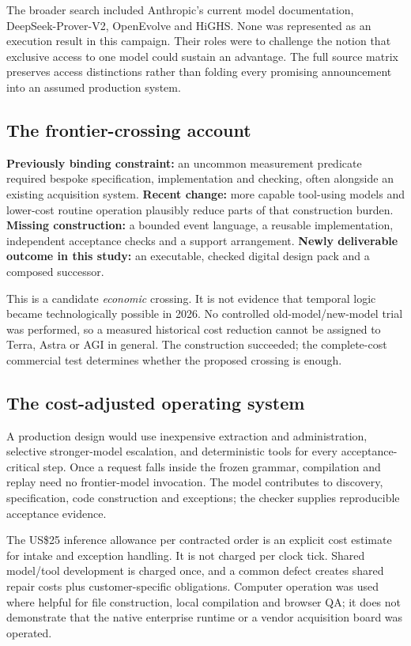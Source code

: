 The broader search included Anthropic's current model documentation, DeepSeek-Prover-V2, OpenEvolve and HiGHS. None was represented as an execution result in this campaign. Their roles were to challenge the notion that exclusive access to one model could sustain an advantage. The full source matrix preserves access distinctions rather than folding every promising announcement into an assumed production system.\cite{alphaevolve,openevolve,deepseek,yosys}

\subsection{The frontier-crossing account}
\textbf{Previously binding constraint:} an uncommon measurement predicate required bespoke specification, implementation and checking, often alongside an existing acquisition system. \textbf{Recent change:} more capable tool-using models and lower-cost routine operation plausibly reduce parts of that construction burden. \textbf{Missing construction:} a bounded event language, a reusable implementation, independent acceptance checks and a support arrangement. \textbf{Newly deliverable outcome in this study:} an executable, checked digital design pack and a composed successor.

This is a candidate \emph{economic} crossing. It is not evidence that temporal logic became technologically possible in 2026. No controlled old-model/new-model trial was performed, so a measured historical cost reduction cannot be assigned to Terra, Astra or AGI in general. The construction succeeded; the complete-cost commercial test determines whether the proposed crossing is enough.

\subsection{The cost-adjusted operating system}
A production design would use inexpensive extraction and administration, selective stronger-model escalation, and deterministic tools for every acceptance-critical step. Once a request falls inside the frozen grammar, compilation and replay need no frontier-model invocation. The model contributes to discovery, specification, code construction and exceptions; the checker supplies reproducible acceptance evidence.

The US\$25 inference allowance per contracted order is an explicit cost estimate for intake and exception handling. It is not charged per clock tick. Shared model/tool development is charged once, and a common defect creates shared repair costs plus customer-specific obligations. Computer operation was used where helpful for file construction, local compilation and browser QA; it does not demonstrate that the native enterprise runtime or a vendor acquisition board was operated.

